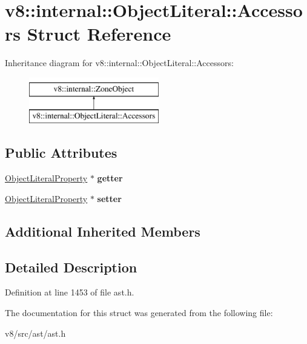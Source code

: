 \hypertarget{structv8_1_1internal_1_1ObjectLiteral_1_1Accessors}{}\section{v8\+:\+:internal\+:\+:Object\+Literal\+:\+:Accessors Struct Reference}
\label{structv8_1_1internal_1_1ObjectLiteral_1_1Accessors}
Inheritance diagram for v8\+:\+:internal\+:\+:Object\+Literal\+:\+:Accessors\+:\begin{figure}[H]
\begin{center}
\leavevmode
\includegraphics[height=2.000000cm]{structv8_1_1internal_1_1ObjectLiteral_1_1Accessors}
\end{center}
\end{figure}
\subsection*{Public Attributes}
\begin{DoxyCompactItemize}
\item 
\mbox{\label{structv8_1_1internal_1_1ObjectLiteral_1_1Accessors_ad6206e1f4b41848f1b36116ae972da8c}} 
\mbox{\hyperlink{classv8_1_1internal_1_1ObjectLiteralProperty}{Object\+Literal\+Property}} $\ast$ {\bfseries getter}
\item 
\mbox{\label{structv8_1_1internal_1_1ObjectLiteral_1_1Accessors_a5d319b2c9b5e07d608c478e11c9e467e}} 
\mbox{\hyperlink{classv8_1_1internal_1_1ObjectLiteralProperty}{Object\+Literal\+Property}} $\ast$ {\bfseries setter}
\end{DoxyCompactItemize}
\subsection*{Additional Inherited Members}


\subsection{Detailed Description}


Definition at line 1453 of file ast.\+h.



The documentation for this struct was generated from the following file\+:\begin{DoxyCompactItemize}
\item 
v8/src/ast/ast.\+h\end{DoxyCompactItemize}

